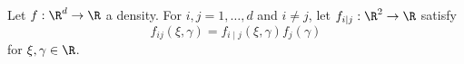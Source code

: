 




Let $f: \R^d \to \R$ a density.
For $i, j = 1, \dots, d$ and
$i \neq j$,
let $f_{i \mid j}: \R^2 \to \R$
satisfy
\[
f_{ij}(\xi, \gamma) = f_{i \mid j}(\xi, \gamma)f_j(\gamma)
\]
for $\xi, \gamma \in \R$.

